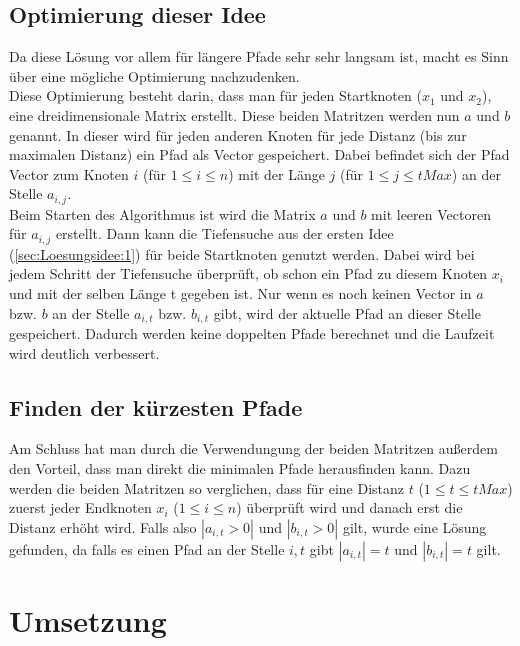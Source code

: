 \documentclass[a4paper,10pt,ngerman]{scrartcl}
\begin{document}
    \subsection{Optimierung dieser Idee}
      Da diese Lösung vor allem für längere Pfade sehr sehr langsam ist, macht es Sinn über eine mögliche Optimierung nachzudenken.
      \\
      Diese Optimierung besteht darin, dass man für jeden Startknoten ($x_{1}$ und $x_{2}$), eine dreidimensionale Matrix erstellt. Diese beiden Matritzen werden nun $a$ und $b$ genannt. In dieser wird für jeden anderen Knoten für jede Distanz (bis zur maximalen Distanz) ein Pfad als Vector gespeichert. Dabei befindet sich der Pfad Vector zum Knoten $i$ (für $1 \leq i \leq n$) mit der Länge $j$ (für $1 \leq j \leq tMax$) an der Stelle $a_{i,j}$.
      \\Beim Starten des Algorithmus ist wird die Matrix $a$ und $b$ mit leeren Vectoren für $a_{i,j}$ erstellt. Dann kann die Tiefensuche aus der ersten Idee (\cref{sec:Loesungsidee:1}) für beide Startknoten genutzt werden. Dabei wird bei jedem Schritt der Tiefensuche überprüft, ob schon ein Pfad zu diesem Knoten $x_{i}$ und mit der selben Länge {t} gegeben ist. Nur wenn es noch keinen Vector in $a$ bzw. $b$ an der Stelle $a_{i,t}$ bzw. $b_{i,t}$ gibt, wird der aktuelle Pfad an dieser Stelle gespeichert. Dadurch werden keine doppelten Pfade berechnet und die Laufzeit wird deutlich verbessert.
    \subsection{Finden der kürzesten Pfade}
      Am Schluss hat man durch die Verwendungung der beiden Matritzen außerdem den Vorteil, dass man direkt die minimalen Pfade herausfinden kann. Dazu werden die beiden Matritzen so verglichen, dass für eine Distanz $t$ ($1 \leq t \leq tMax$) zuerst jeder Endknoten $x_{i}$ ($1 \leq i \leq n$) überprüft wird und danach erst die Distanz erhöht wird. Falls also $|a_{i,t} > 0|$ und $|b_{i,t} > 0|$ gilt, wurde eine Lösung gefunden, da falls es einen Pfad an der Stelle $i,t$ gibt $|a_{i,t}| = t$ und $|b_{i,t}| = t$ gilt.
      

  \section{Umsetzung\label{sec:Umsetzung}}
\end{document}
